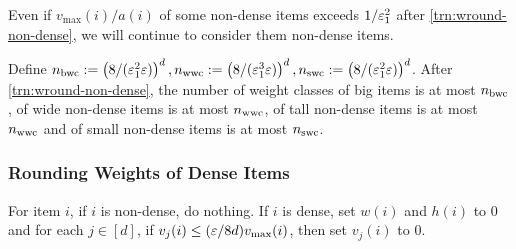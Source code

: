 Even if $v_{\max}(i)/a(i)$ of some non-dense items exceeds $1/\varepsilon_1^2$
after \cref{trn:wround-non-dense}, we will continue to consider them non-dense items.

\begin{lemma}
\label{lem:num-weight-classes}
Define
$n_{\mathrm{bwc}} := \left(8/(\varepsilon_1^2\varepsilon)\right)^d,
 n_{\mathrm{wwc}} := \left(8/(\varepsilon_1^3\varepsilon)\right)^d,
 n_{\mathrm{swc}} := \left(8/(\varepsilon_1^2\varepsilon)\right)^d$.
After \cref{trn:wround-non-dense}, the number of weight classes
of big items is at most $n_{\mathrm{bwc}}$,
of wide non-dense items is at most $n_{\mathrm{wwc}}$,
of tall non-dense items is at most $n_{\mathrm{wwc}}$
and of small non-dense items is at most $n_{\mathrm{swc}}$.
\end{lemma}

\subsubsection{Rounding Weights of Dense Items}

\begin{transformation}
\label{trn:round-to-0}
For item $i$, if $i$ is non-dense, do nothing. If $i$ is dense, set $w(i)$ and $h(i)$ to 0 and
for each $j \in [d]$, if $v_j(i) \le (\varepsilon/8d) v_{\max}(i)$, then set $v_j(i)$ to 0.
\end{transformation}


